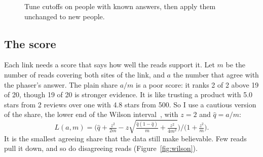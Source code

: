 \documentclass[11pt]{article}
\begin{document}
\begin{figure}[h]
\centering
{}
\caption{Tune cutoffs on people with known answers, then apply them unchanged to new people.}
\label{fig:trustflow}
\end{figure}

\subsection{The score}

Each link needs a score that says how well the reads support it. Let $m$
be the number of reads covering both sites of the link, and $a$ the number
that agree with the phaser's answer. The plain share $a/m$ is a poor score:
it ranks 2 of 2 above 19 of 20, though 19 of 20 is stronger evidence. It
is like trusting a product with 5.0 stars from 2 reviews over one with 4.8
stars from 500. So I use a cautious version of the share, the lower end of
the Wilson interval~\cite{wilson1927}, with $z=2$ and $\hat q=a/m$:
\[
L(a,m)=\Big(\hat q+\tfrac{z^2}{2m}-z\sqrt{\tfrac{\hat q(1-\hat q)}{m}
+\tfrac{z^2}{4m^2}}\Big)\Big/\Big(1+\tfrac{z^2}{m}\Big).
\]
It is the smallest agreeing share that the data still make believable.
Few reads pull it down, and so do disagreeing reads
(Figure~\ref{fig:wilson}).
\end{document}
